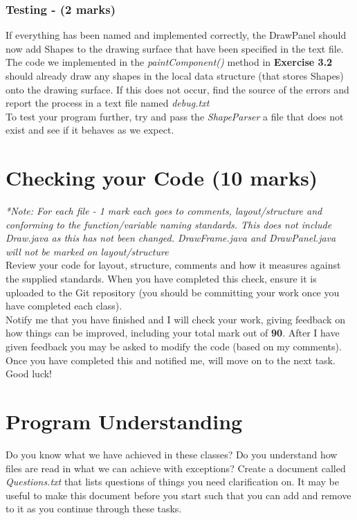 \documentclass[a4paper,12pt]{article}
\begin{document}
\subsubsection{Testing - (2 marks)}
If everything has been named and implemented correctly, the DrawPanel should now add Shapes to the drawing surface that have been specified in the text file. The code we implemented in the \textit{paintComponent()} method in {\bf Exercise 3.2} should already draw any shapes in the local data structure (that stores Shapes) onto the drawing surface. If this does not occur, find the source of the errors and report the process in a text file named \textit{debug.txt}\\

To test your program further, try and pass the \textit{ShapeParser} a file that does not exist and see if it behaves as we expect.


\newpage
\section{Checking your Code (10 marks)}
\textit{*Note: For each file - 1 mark each goes to comments, layout/structure and conforming to the function/variable naming standards. This does not include Draw.java as this has not been changed. DrawFrame.java and DrawPanel.java will not be marked on layout/structure}\\

Review your code for layout, structure, comments and how it measures against the supplied standards. When you have completed this check, ensure it is uploaded to the Git repository (you should be committing your work once you have completed each class).\\

Notify me that you have finished and I will check your work, giving feedback on how things can be improved, including your total mark out of {\bf 90}. After I have given feedback you may be asked to modify the code (based on my comments). Once you have completed this and notified me, will move on to the next task. Good luck!

\vspace{0.5cm}
\section{Program Understanding}
Do you know what we have achieved in these classes? Do you understand how files are read in what we can achieve with exceptions? Create a document called \textit{Questions.txt} that lists questions of things you need clarification on. It may be useful to make this document before you start such that you can add and remove to it as you continue through these tasks.
\end{document}
